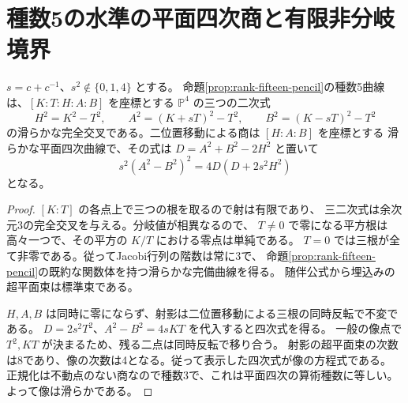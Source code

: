 \section{種数5の水準の平面四次商と有限非分岐境界}
\label{sec:rank-fifteen-pencil-unramified}
\begin{proposition}\label{prop:rank-fifteen-pencil-plane}
$s=c+c^{-1}$、$s^2\notin\{0,1,4\}$ とする。
命題\ref{prop:rank-fifteen-pencil}の種数5曲線は、$[K:T:H:A:B]$ を座標とする
$\mathbb P^4$ の三つの二次式
\[
 H^2=K^2-T^2,\qquad A^2=(K+sT)^2-T^2,\qquad B^2=(K-sT)^2-T^2
\]
の滑らかな完全交叉である。二位置移動による商は $[H:A:B]$ を座標とする
滑らかな平面四次曲線で、その式は $D=A^2+B^2-2H^2$ と置いて
\[
 s^2(A^2-B^2)^2=4D(D+2s^2H^2)
\]
となる。
\end{proposition}
\begin{proof}
$[K:T]$ の各点上で三つの根を取るので射は有限であり、
三二次式は余次元3の完全交叉を与える。分岐値が相異なるので、
$T\ne0$ で零になる平方根は高々一つで、その平方の $K/T$ における零点は単純である。
$T=0$ では三根が全て非零である。従ってJacobi行列の階数は常に3で、
命題\ref{prop:rank-fifteen-pencil}の既約な関数体を持つ滑らかな完備曲線を得る。
随伴公式から埋込みの超平面束は標準束である。

$H,A,B$ は同時に零にならず、射影は二位置移動による三根の同時反転で不変である。
$D=2s^2T^2$、$A^2-B^2=4sKT$ を代入すると四次式を得る。
一般の像点で $T^2,KT$ が決まるため、残る二点は同時反転で移り合う。
射影の超平面束の次数は8であり、像の次数は4となる。従って表示した四次式が像の方程式である。
正規化は不動点のない商なので種数3で、これは平面四次の算術種数に等しい。
よって像は滑らかである。
\end{proof}

